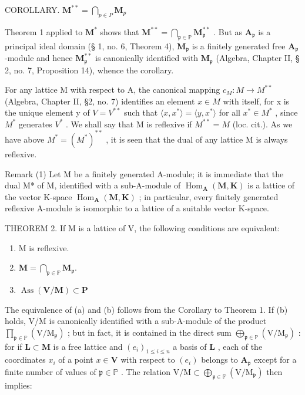 COROLLARY. \(\mathbf{M}^{**} = \bigcap_{p \in P}\mathbf{M}_{p}\)

Theorem 1 applied to \(\mathbf{M}^*\) shows that \(\mathbf{M}^{**} = \bigcap_{\mathfrak{p}\in \mathbb{P}}\mathbf{M}_{\mathfrak{p}}^{**}\) . But as \(\mathbf{A}_{\mathfrak{p}}\) is a principal ideal domain (§ 1, no. 6, Theorem 4), \(\mathbf{M}_{\mathfrak{p}}\) is a finitely generated free \(\mathbf{A}_{\mathfrak{p}}\) -module and hence \(\mathbf{M}_{\mathfrak{p}}^{**}\) is canonically identified with \(\mathbf{M}_{\mathfrak{p}}\) (Algebra, Chapter II, § 2, no. 7, Proposition 14), whence the corollary.

For any lattice M with respect to A, the canonical mapping \(c_{M}: M \to M^{**}\) (Algebra, Chapter II, §2, no. 7) identifies an element \(x \in M\) with itself, for x is the unique element y of \(V = V^{**}\) such that \(\langle x, x^{*} \rangle = \langle y, x^{*} \rangle\) for all \(x^{*} \in M^{*}\) , since \(M^{*}\) generates \(V^{*}\) . We shall say that M is reflexive if \(M^{**} = M\) (loc. cit.). As we have above \(M^{*} = (M^{*})^{**}\) , it is seen that the dual of any lattice M is always reflexive.

Remark (1) Let M be a finitely generated A-module; it is immediate that the dual M* of M, identified with a sub-A-module of \(\operatorname{Hom}_{\mathbf{A}}(\mathbf{M}, \mathbf{K})\) is a lattice of the vector K-space \(\operatorname{Hom}_{\mathbf{A}}(\mathbf{M}, \mathbf{K})\) ; in particular, every finitely generated reflexive A-module is isomorphic to a lattice of a suitable vector K-space.

THEOREM 2. If M is a lattice of V, the following conditions are equivalent:

\begin{enumerate}
\def\labelenumi{(\alph{enumi})}
\item
  M is reflexive.
\item
  \(\mathbf{M} = \bigcap_{\mathfrak{p}\in \mathbb{P}}\mathbf{M}_{\mathfrak{p}}.\)
\item
  \(\operatorname{Ass}(\mathbf{V} / \mathbf{M})\subset \mathbf{P}\)
\end{enumerate}

The equivalence of (a) and (b) follows from the Corollary to Theorem 1. If (b) holds, V/M is canonically identified with a sub-A-module of the product \(\prod_{\mathfrak{p} \in \mathbb{P}} (\mathrm{V} / \mathrm{M}_{\mathfrak{p}})\) ; but in fact, it is contained in the direct sum \(\bigoplus_{\mathfrak{p} \in \mathbb{P}} (\mathrm{V} / \mathrm{M}_{\mathfrak{p}})\) : for if \(\mathbf{L} \subset \mathbf{M}\) is a free lattice and \((e_i)_{1 \leq i \leq n}\) a basis of \(\mathbf{L}\) , each of the coordinates \(x_i\) of a point \(x \in \mathbf{V}\) with respect to \((e_i)\) belongs to \(\mathbf{A}_{\mathfrak{p}}\) except for a finite number of values of \(\mathfrak{p} \in \mathbb{P}\) . The relation \(\mathrm{V} / \mathrm{M} \subset \bigoplus_{\mathfrak{p} \in \mathbb{P}} (\mathrm{V} / \mathrm{M}_{\mathfrak{p}})\) then implies:

